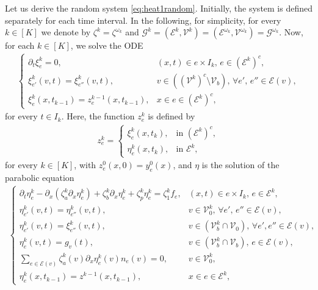 \documentclass[10pt,a4paper]{amsart}
\begin{document}
Let us derive the random system \eqref{eq:heat1random}. Initially, the system is defined separately for each time interval. In the following, for simplicity, for every $k\in [K]$ we denote by $\zeta^k = \zeta^{\omega_k}$ and $\mathcal{G}^k=(\mathcal{E}^k,\mathcal{V}^k) = (\mathcal{E}^{\omega_k},\mathcal{V}^{\omega_k})=\mathcal{G}^{\omega_k}$. Now, for each $k \in [K]$, we solve the ODE 
\begin{align}\label{eq:random_interval2}
    \begin{cases}
        \partial_t \xi_e^k = 0, & (x,t) \in e \times I_k, \, e \in \left( \mathcal{E}^k \right)^c, \\
        \xi_{e'}^k(v,t) = \xi_{e''}^{k}(v,t), &v\in \left( (\mathcal{V}^k)^c \setminus \mathcal{V}_b \right),\,\forall e',\, e'' \in \mathcal{E}(v), \\
        \xi_e^k(x,t_{k-1}) = z_e^{k-1}(x,t_{k-1}), & x \in e \in \left( \mathcal{E}^k \right)^c,
    \end{cases}
\end{align}
for every $t\in I_k$. Here, the function $z_e^{k}$ is defined by
\begin{align}\label{eq:definition_z}
      z_e^{k} = \begin{cases}
          \xi_e^{k}(x,t_{k}), & \text{in } \left( \mathcal{E}^k \right)^c, \\
          \eta_e^{k}(x,t_{k}), & \text{in } \mathcal{E}^k,
      \end{cases}
\end{align}
for every $k \in [K]$, with $z^0_e(x,0) = y_e^0(x)$, and $\eta$ is the solution of the parabolic equation
\begin{align}\label{eq:random_interval1}
      \begin{cases}
        \partial_t \eta_e^k - \partial_{x}(\zeta^k_a \partial_x \eta^k_e) + \zeta_b^k \partial_x \eta_e^k + \zeta_p^k \eta_e^k = \zeta^k_1 f_e, & (x,t) \in e \times I_k, \, e \in \mathcal{E}^k, \\
        \eta_{e'}^k(v,t) = \eta_{e''}^k(v,t), & v \in \mathcal{V}_0^k,\, \forall e',\, e'' \in \mathcal{E}(v),\\
        \eta_{e'}^k(v,t) = \xi_{e''}^k(v,t), & v \in (\mathcal{V}^k_b \cap \mathcal{V}_0),\, \forall e', e'' \in \mathcal{E}(v), \\
        \eta_e^k(v,t) = g_v(t), & v \in (\mathcal{V}_b^k \cap \mathcal{V}_b),\, e \in \mathcal{E}(v), \\
        \sum_{e \in \mathcal{E}(v)}\zeta^k_a(v)\partial_x \eta_e^k(v) n_e(v) = 0, &v \in \mathcal{V}_0^k, \\
        \eta_e^k(x,t_{k-1}) = z^{k-1}(x,t_{k-1}), & x \in e \in \mathcal{E}^k,
      \end{cases}
\end{align}
\end{document}
